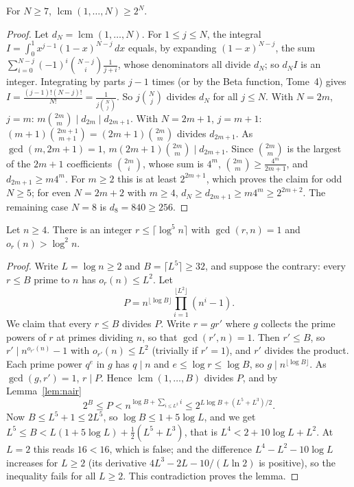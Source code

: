 \begin{lemma}[Nair]\label{lem:nair}
For $N\ge7$, $\operatorname{lcm}(1,\dots,N)\ge2^N$.
\end{lemma}
\begin{proof}
Let $d_N=\operatorname{lcm}(1,\dots,N)$. For $1\le j\le N$, the integral $I=\int_0^1x^{j-1}(1-x)^{N-j}\,dx$ equals, by expanding $(1-x)^{N-j}$, the sum $\sum_{i=0}^{N-j}(-1)^i\binom{N-j}i\frac1{j+i}$, whose denominators all divide $d_N$; so $d_NI$ is an integer. Integrating by parts $j-1$ times (or by the Beta function, Tome~4) gives $I=\frac{(j-1)!(N-j)!}{N!}=\frac1{j\binom Nj}$.
So $j\binom Nj$ divides $d_N$ for all $j\le N$. With $N=2m$, $j=m$: $m\binom{2m}m\mid d_{2m}\mid d_{2m+1}$. With $N=2m+1$, $j=m+1$: $(m+1)\binom{2m+1}{m+1}=(2m+1)\binom{2m}m$ divides $d_{2m+1}$. As $\gcd(m,2m+1)=1$, $m(2m+1)\binom{2m}m\mid d_{2m+1}$. Since $\binom{2m}m$ is the largest of the $2m+1$ coefficients $\binom{2m}i$, whose sum is $4^m$,
$\binom{2m}m\ge\frac{4^m}{2m+1}$, and $d_{2m+1}\ge m4^m$. For $m\ge2$ this is at least $2^{2m+1}$, which proves the claim for odd $N\ge5$; for even $N=2m+2$ with $m\ge4$, $d_N\ge d_{2m+1}\ge m4^m\ge2^{2m+2}$. The remaining case $N=8$ is $d_8=840\ge256$.
\end{proof}

\begin{lemma}\label{lem:aksr}
Let $n\ge4$. There is an integer $r\le\lceil\log^5n\rceil$ with $\gcd(r,n)=1$ and $o_r(n)>\log^2n$.
\end{lemma}
\begin{proof}
Write $L=\log n\ge2$ and $B=\lceil L^5\rceil\ge32$, and suppose the contrary: every $r\le B$ prime to $n$ has $o_r(n)\le L^2$. Let
\[
P=n^{\lfloor\log B\rfloor}\prod_{i=1}^{\lfloor L^2\rfloor}(n^i-1).
\]
We claim that every $r\le B$ divides $P$. Write $r=gr'$ where $g$ collects the prime powers of $r$ at primes dividing $n$, so that $\gcd(r',n)=1$. Then $r'\le B$, so $r'\mid n^{o_{r'}(n)}-1$ with $o_{r'}(n)\le L^2$ (trivially if $r'=1$), and $r'$ divides the product. Each prime power $q^e$ in $g$ has $q\mid n$ and $e\le\log r\le\log B$, so $g\mid n^{\lfloor\log B\rfloor}$. As $\gcd(g,r')=1$, $r\mid P$.
Hence $\operatorname{lcm}(1,\dots,B)$ divides $P$, and by Lemma~\ref{lem:nair}
\[
2^B\le P<n^{\log B+\sum_{i\le L^2}i}\le2^{L\log B+(L^5+L^3)/2}.
\]
Now $B\le L^5+1\le2L^5$, so $\log B\le1+5\log L$, and we get $L^5\le B<L(1+5\log L)+\frac12(L^5+L^3)$, that is $L^4<2+10\log L+L^2$. At $L=2$ this reads $16<16$, which is false; and the difference $L^4-L^2-10\log L$ increases for $L\ge2$ (its derivative $4L^3-2L-10/(L\ln2)$ is positive), so the inequality fails for all $L\ge2$. This contradiction proves the lemma.
\end{proof}

